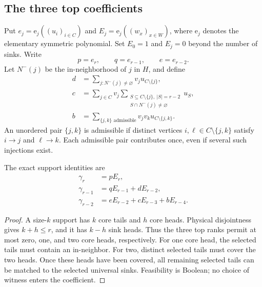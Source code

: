\documentclass[11pt]{article}
\numberwithin{equation}{section}
\theoremstyle{definition}\newtheorem{definition}[theorem]{Definition}\newtheorem{remark}[theorem]{Remark}
\newcommand{\ee}{\mathrm e}                %
\begin{document}
\subsection{The three top coefficients}
Put $e_j=\ee_j((u_i)_{i\in C})$ and $E_j=\ee_j((w_x)_{x\in W})$, where $\ee_j$ denotes the elementary symmetric polynomial. Set $E_0=1$ and $E_j=0$ beyond the number of sinks. Write
\[
 p=e_r,\qquad q=e_{r-1},\qquad e=e_{r-2}.
\]
Let $N^-(j)$ be the in-neighborhood of $j$ in $H$, and define
\begin{align*}
 d&=\sum_{j:N^-(j)\ne\varnothing}v_j u_{C\setminus\{j\}},\\
 c&=\sum_{j\in C}v_j
       \sum_{\substack{S\subseteq C\setminus\{j\},\ |S|=r-2\\
                       S\cap N^-(j)\ne\varnothing}}u_S,\\
 b&=\sum_{\{j,k\}\text{ admissible}}v_jv_k u_{C\setminus\{j,k\}}.
\end{align*}
An unordered pair $\{j,k\}$ is admissible if distinct vertices $i,\ell\in C\setminus\{j,k\}$ satisfy $i\to j$ and $\ell\to k$. Each admissible pair contributes once, even if several such injections exist.

\begin{lemma}\label{pgr:s:lg:lem:coeff}
The exact support identities are
\begin{align}
 \gamma_r&=pE_r,\label{pgr:s:lg:eq:top}\\
 \gamma_{r-1}&=qE_{r-1}+dE_{r-2},\label{pgr:s:lg:eq:next}\\
 \gamma_{r-2}&=eE_{r-2}+cE_{r-3}+bE_{r-4}.\label{pgr:s:lg:eq:third}
\end{align}
\end{lemma}
\begin{proof}
A size-$k$ support has $k$ core tails and $h$ core heads. Physical disjointness gives $k+h\le r$, and it has $k-h$ sink heads. Thus the three top ranks permit at most zero, one, and two core heads, respectively. For one core head, the selected tails must contain an in-neighbor. For two, distinct selected tails must cover the two heads. Once these heads have been covered, all remaining selected tails can be matched to the selected universal sinks. Feasibility is Boolean; no choice of witness enters the coefficient.
\end{proof}
\end{document}
